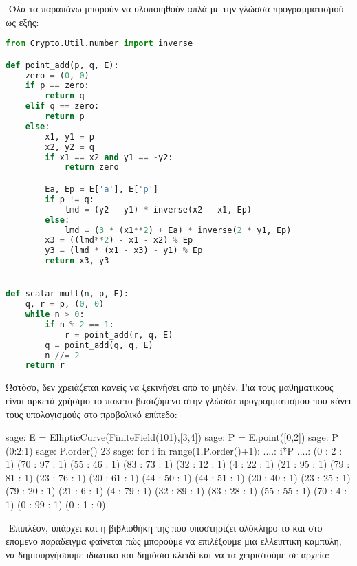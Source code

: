 \documentclass[oneside,a4paper]{article}
\begin{document}
$ $\newline
Όλα τα παραπάνω μπορούν να υλοποιηθούν απλά με την γλώσσα προγραμματισμού  ως εξής:

\vspace*{0.1cm}
\begin{lstlisting}[language = Python]
from Crypto.Util.number import inverse

def point_add(p, q, E):
    zero = (0, 0)
    if p == zero:
        return q
    elif q == zero:
        return p
    else:
        x1, y1 = p
        x2, y2 = q
        if x1 == x2 and y1 == -y2:
            return zero

        Ea, Ep = E['a'], E['p']
        if p != q:
            lmd = (y2 - y1) * inverse(x2 - x1, Ep)
        else:
            lmd = (3 * (x1**2) + Ea) * inverse(2 * y1, Ep)
        x3 = ((lmd**2) - x1 - x2) % Ep
        y3 = (lmd * (x1 - x3) - y1) % Ep
        return x3, y3


def scalar_mult(n, p, E):
    q, r = p, (0, 0)
    while n > 0:
        if n % 2 == 1:
            r = point_add(r, q, E)
        q = point_add(q, q, E)
        n //= 2
    return r

\end{lstlisting}

Ώστόσο, δεν χρειάζεται κανείς να ξεκινήσει από το μηδέν. Για τους μαθηματικούς είναι αρκετά χρήσιμο το πακέτο  βασιζόμενο στην γλώσσα προγραμματισμού  που κάνει τους υπολογισμούς στο προβολικό επίπεδο:
\pagebreak
{}
\begin{sageblock}
	sage: E = EllipticCurve(FiniteField(101),[3,4])
	sage: P = E.point([0,2])
	sage: P
	(0:2:1)
	sage: P.order()
	23
	sage: for i in range(1,P.order()+1):
	....: 	i*P
	....:
	(0 : 2 : 1)
	(70 : 97 : 1)
	(55 : 46 : 1)
	(83 : 73 : 1)
	(32 : 12 : 1)
	(4 : 22 : 1)
	(21 : 95 : 1)
	(79 : 81 : 1)
	(23 : 76 : 1)
	(20 : 61 : 1)
	(44 : 50 : 1)
	(44 : 51 : 1)
	(20 : 40 : 1)
	(23 : 25 : 1)
	(79 : 20 : 1)
	(21 : 6 : 1)
	(4 : 79 : 1)
	(32 : 89 : 1)
	(83 : 28 : 1)
	(55 : 55 : 1)
	(70 : 4 : 1)
	(0 : 99 : 1)
	(0 : 1 : 0)
\end{sageblock}

$ $\newline
Επιπλέον, υπάρχει και η βιβλιοθήκη  της  που υποστηρίζει ολόκληρο το  και στο επόμενο παράδειγμα φαίνεται πώς μπορούμε να επιλέξουμε μια ελλειπτική καμπύλη, να δημιουργήσουμε ιδιωτικό και δημόσιο κλειδί και να τα χειριστούμε σε αρχεία:
\end{document}
